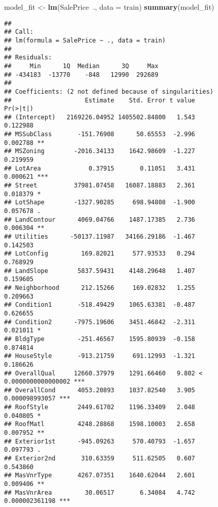 \documentclass[]{article}
\newenvironment{Shaded}{\begin{snugshade}}{\end{snugshade}}
\newcommand{\DataTypeTok}[1]{\textcolor[rgb]{0.13,0.29,0.53}{#1}}
\newcommand{\KeywordTok}[1]{\textcolor[rgb]{0.13,0.29,0.53}{\textbf{#1}}}
\newcommand{\NormalTok}[1]{#1}
\newcommand{\OperatorTok}[1]{\textcolor[rgb]{0.81,0.36,0.00}{\textbf{#1}}}
\newcommand{\StringTok}[1]{\textcolor[rgb]{0.31,0.60,0.02}{#1}}
\begin{document}
\begin{Shaded}
\begin{Highlighting}[]
\NormalTok{model_fit <-}\StringTok{ }\KeywordTok{lm}\NormalTok{(SalePrice}\OperatorTok{~}\NormalTok{., }\DataTypeTok{data =}\NormalTok{ train)}
\KeywordTok{summary}\NormalTok{(model_fit)}
\end{Highlighting}
\end{Shaded}

\begin{verbatim}
## 
## Call:
## lm(formula = SalePrice ~ ., data = train)
## 
## Residuals:
##     Min      1Q  Median      3Q     Max 
## -434183  -13770    -848   12990  292689 
## 
## Coefficients: (2 not defined because of singularities)
##                    Estimate    Std. Error t value             Pr(>|t|)    
## (Intercept)   2169226.04952 1405502.84800   1.543             0.122988    
## MSSubClass       -151.76908      50.65553  -2.996             0.002788 ** 
## MSZoning        -2016.34133    1642.98609  -1.227             0.219959    
## LotArea             0.37915       0.11051   3.431             0.000621 ***
## Street          37981.07458   16087.18883   2.361             0.018379 *  
## LotShape        -1327.90285     698.94808  -1.900             0.057678 .  
## LandContour      4069.04766    1487.17385   2.736             0.006304 ** 
## Utilities      -50137.11987   34166.29186  -1.467             0.142503    
## LotConfig         169.82021     577.93533   0.294             0.768929    
## LandSlope        5837.59431    4148.29648   1.407             0.159605    
## Neighborhood      212.15266     169.02832   1.255             0.209663    
## Condition1       -518.49429    1065.63381  -0.487             0.626655    
## Condition2      -7975.19606    3451.46842  -2.311             0.021011 *  
## BldgType         -251.46567    1595.80939  -0.158             0.874814    
## HouseStyle       -913.21759     691.12993  -1.321             0.186626    
## OverallQual     12660.37979    1291.66460   9.802 < 0.0000000000000002 ***
## OverallCond      4053.20893    1037.82540   3.905       0.000098993057 ***
## RoofStyle        2449.61702    1196.33409   2.048             0.040805 *  
## RoofMatl         4248.28868    1598.10003   2.658             0.007952 ** 
## Exterior1st      -945.09263     570.40793  -1.657             0.097793 .  
## Exterior2nd       310.63359     511.62505   0.607             0.543860    
## MasVnrType       4267.07351    1640.62044   2.601             0.009406 ** 
## MasVnrArea         30.06517       6.34084   4.742       0.000002361198 ***

\end{verbatim}
\end{document}
